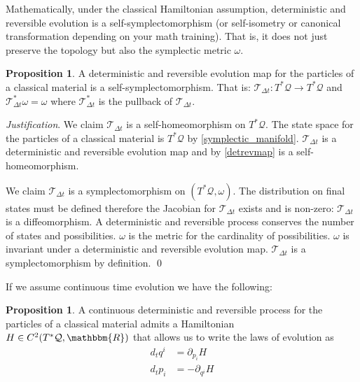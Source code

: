 \documentclass[aps,pra,10pt,twocolumn,floatfix,nofootinbib]{revtex4-1}
\numberwithin{equation}{section}
\theoremstyle{definition}
\newtheorem{prop}[equation]{Proposition}
\newenvironment{justification}{\emph{Justification}.}{\qed}
\begin{document}
Mathematically, under the classical Hamiltonian assumption,  deterministic and reversible evolution is a self-symplectomorphism (or self-isometry or canonical transformation depending on your math training). That is, it does not just preserve the topology but also the symplectic metric $\omega$.

\begin{prop}\label{canonical_transformation}
	A deterministic and reversible evolution map for the particles of a classical material is a self-symplectomorphism. That is: $\mathcal{T}_{\Delta t}: T^*\mathcal{Q} \rightarrow T^*\mathcal{Q}$ and $\mathcal{T}_{\Delta t}^*\omega = \omega$ where $\mathcal{T}_{\Delta t}^*$ is the pullback of $\mathcal{T}_{\Delta t}$.
\end{prop}

\begin{justification}
	We claim $\mathcal{T}_{\Delta t}$ is a self-homeomorphism on $T^*\mathcal{Q}$. The state space for the particles of a classical material is $T^*\mathcal{Q}$ by \ref{symplectic_manifold}. $\mathcal{T}_{\Delta t}$ is a deterministic and reversible evolution map and by \ref{detrevmap} is a self-homeomorphism.
	
	We claim $\mathcal{T}_{\Delta t}$ is a symplectomorphism on $(T^*\mathcal{Q}, \omega)$. The distribution on final states must be defined  therefore the Jacobian for $\mathcal{T}_{\Delta t}$ exists and is non-zero: $\mathcal{T}_{\Delta t}$ is a diffeomorphism. A deterministic and reversible process conserves the number of states and possibilities. $\omega$ is the metric for the cardinality of possibilities. $\omega$ is invariant under a deterministic and reversible evolution map. $\mathcal{T}_{\Delta t}$ is a symplectomorphism by definition.
\end{justification}

If we assume continuous time evolution we have the following:

\begin{prop}\label{hamiltons_equations}
	A continuous deterministic and reversible process for the particles of a classical material admits a Hamiltonian $H \in C^2(T^*\mathcal{Q}, \mathbbm{R})$ that allows us to write the laws of evolution as
\begin{align*}
d_{t}q^i &= \partial_{p_i} H \\
d_{t}p_i &= - \partial_{q^i} H
\end{align*}
\end{prop}
\end{document}
